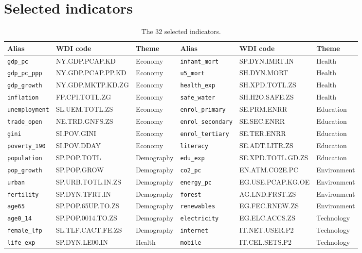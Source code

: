 \documentclass[11pt,a4paper]{article}
\newcommand{\var}[1]{\texttt{#1}}
\begin{document}
\section{Selected indicators}\label{app:vars}
\begin{table}[htbp]\centering\footnotesize
\caption{The 32 selected indicators.}\label{tab:vars}
\begin{adjustbox}{max width=\textwidth}\begin{tabular}{lll|lll}
\toprule
Alias & WDI code & Theme & Alias & WDI code & Theme \\
\midrule
\var{gdp\_pc} & NY.GDP.PCAP.KD & Economy & \var{infant\_mort} & SP.DYN.IMRT.IN & Health \\
\var{gdp\_pc\_ppp} & NY.GDP.PCAP.PP.KD & Economy & \var{u5\_mort} & SH.DYN.MORT & Health \\
\var{gdp\_growth} & NY.GDP.MKTP.KD.ZG & Economy & \var{health\_exp} & SH.XPD.TOTL.ZS & Health \\
\var{inflation} & FP.CPI.TOTL.ZG & Economy & \var{safe\_water} & SH.H2O.SAFE.ZS & Health \\
\var{unemployment} & SL.UEM.TOTL.ZS & Economy & \var{enrol\_primary} & SE.PRM.ENRR & Education \\
\var{trade\_open} & NE.TRD.GNFS.ZS & Economy & \var{enrol\_secondary} & SE.SEC.ENRR & Education \\
\var{gini} & SI.POV.GINI & Economy & \var{enrol\_tertiary} & SE.TER.ENRR & Education \\
\var{poverty\_190} & SI.POV.DDAY & Economy & \var{literacy} & SE.ADT.LITR.ZS & Education \\
\var{population} & SP.POP.TOTL & Demography & \var{edu\_exp} & SE.XPD.TOTL.GD.ZS & Education \\
\var{pop\_growth} & SP.POP.GROW & Demography & \var{co2\_pc} & EN.ATM.CO2E.PC & Environment \\
\var{urban} & SP.URB.TOTL.IN.ZS & Demography & \var{energy\_pc} & EG.USE.PCAP.KG.OE & Environment \\
\var{fertility} & SP.DYN.TFRT.IN & Demography & \var{forest} & AG.LND.FRST.ZS & Environment \\
\var{age65} & SP.POP.65UP.TO.ZS & Demography & \var{renewables} & EG.FEC.RNEW.ZS & Environment \\
\var{age0\_14} & SP.POP.0014.TO.ZS & Demography & \var{electricity} & EG.ELC.ACCS.ZS & Technology \\
\var{female\_lfp} & SL.TLF.CACT.FE.ZS & Demography & \var{internet} & IT.NET.USER.P2 & Technology \\
\var{life\_exp} & SP.DYN.LE00.IN & Health & \var{mobile} & IT.CEL.SETS.P2 & Technology \\
\bottomrule
\end{tabular}\end{adjustbox}
\end{table}
\end{document}
